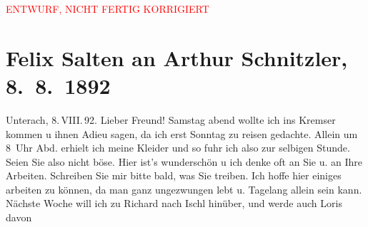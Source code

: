 
\begin{center}
            \textcolor{red}{ENTWURF, NICHT FERTIG KORRIGIERT}
                      \end{center}
            
         
         \renewcommand{\erwaehntePersonen}{Personen: Hermann Bahr, Richard Beer-Hofmann, Hugo von Hofmannsthal, Paul Horn, Gustav Schwarzkopf}
         \renewcommand{\erwaehnteOrte}{Orte: Bad Ischl, Berghof, Café Kremser, Deutschland, Unterach am Attersee, Wien}
         \renewcommand{\erwaehnteWerke}{}
               \section[Felix Salten an Arthur Schnitzler, 8. 8. 1892]{ Felix Salten an Arthur Schnitzler, 8. 8. 1892}\nopagebreak{}\rehead{ }\begin{ledgroupsized}[t]{13cm}\normalsize\beginnumbering \toendnotes[C]{\smallbreak\pagebreak[2]} 
\pstart
           {\pb}Unterach, 8. VIII. 92.
               \pend
           \pstart
           Lieber Freund! Samstag abend wollte ich ins Kremser
               kommen u ihnen Adieu sagen, da ich erst Sonntag zu reisen gedachte.
               Allein um 8 Uhr Abd. erhielt ich meine Kleider und so fuhr ich also zur selbigen
               Stunde. Seien Sie also nicht böse. Hier ist's wunderschön u ich denke oft an Sie u.
               an Ihre Arbeiten. Schreiben Sie mir bitte bald, was Sie treiben.\pend
           \pstart
           {\pb}Ich hoffe hier einiges arbeiten zu können, da man ganz ungezwungen lebt
               u. Tagelang allein sein kann. Nächste Woche will ich zu Richard nach Ischl
               hinüber, und werde auch Loris davon

\end{ledgroupsized}
